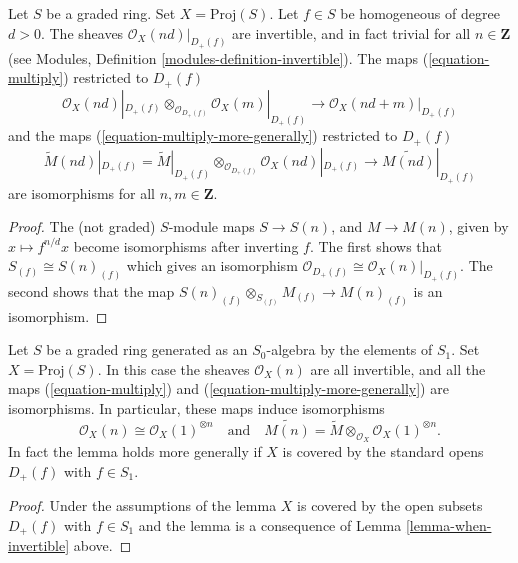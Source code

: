 \begin{lemma}
\label{lemma-when-invertible}
Let $S$ be a graded ring. Set $X = \text{Proj}(S)$.
Let $f \in S$ be homogeneous of degree $d > 0$.
The sheaves $\mathcal{O}_X(nd)|_{D_{+}(f)}$ are invertible,
and in fact trivial for all $n \in \mathbf{Z}$
(see Modules, Definition \ref{modules-definition-invertible}).
The maps (\ref{equation-multiply}) restricted to $D_{+}(f)$
$$
\mathcal{O}_X(nd)|_{D_{+}(f)} \otimes_{\mathcal{O}_{D_{+}(f)}}
\mathcal{O}_X(m)|_{D_{+}(f)}
\longrightarrow
\mathcal{O}_X(nd + m)|_{D_{+}(f)}
$$
and the maps (\ref{equation-multiply-more-generally})
restricted to $D_{+}(f)$
$$
\widetilde M(nd)|_{D_{+}(f)}
=
\widetilde M|_{D_{+}(f)}
\otimes_{\mathcal{O}_{D_{+}(f)}}
\mathcal{O}_X(nd)|_{D_{+}(f)}
\longrightarrow
\widetilde{M(nd)}|_{D_{+}(f)}
$$
are isomorphisms for all $n, m \in \mathbf{Z}$.
\end{lemma}

\begin{proof}
The (not graded) $S$-module maps
$S \to S(n)$, and $M \to M(n)$, given by
$x \mapsto f^{n/d}x$ become isomorphisms
after inverting $f$. The first shows that
$S_{(f)} \cong S(n)_{(f)}$ which gives an isomorphism
$\mathcal{O}_{D_{+}(f)} \cong \mathcal{O}_X(n)|_{D_{+}(f)}$.
The second shows that the map
$S(n)_{(f)} \otimes_{S_{(f)}} M_{(f)} \to M(n)_{(f)}$
is an isomorphism.
\end{proof}

\begin{lemma}
\label{lemma-apply-modules}
Let $S$ be a graded ring generated as an $S_0$-algebra by
the elements of $S_1$. Set $X = \text{Proj}(S)$.
In this case the sheaves $\mathcal{O}_X(n)$ are all invertible,
and all the maps (\ref{equation-multiply}) and
(\ref{equation-multiply-more-generally}) are isomorphisms.
In particular, these maps induce isomorphisms
$$
\mathcal{O}_X(n) \cong \mathcal{O}_X(1)^{\otimes n}
\quad
\text{and}
\quad
\widetilde{M(n)} =
\widetilde{M} \otimes_{\mathcal{O}_X} \mathcal{O}_X(1)^{\otimes n}.
$$
In fact the lemma holds more generally if $X$ is covered by the standard
opens $D_{+}(f)$ with $f \in S_1$.
\end{lemma}

\begin{proof}
Under the assumptions of the lemma $X$ is covered by the
open subsets $D_{+}(f)$ with $f \in S_1$ and the
lemma is a consequence of Lemma \ref{lemma-when-invertible} above.
\end{proof}

